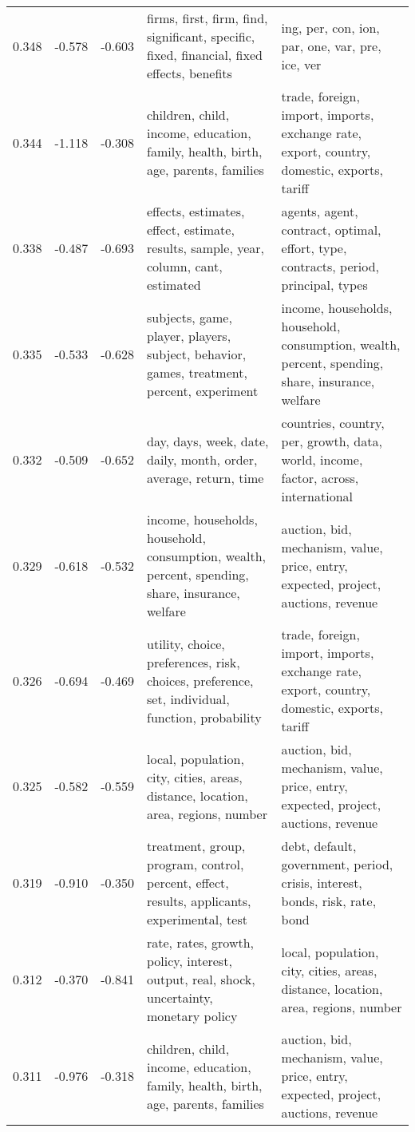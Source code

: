 \begin{tabular}{cccp{5cm}p{5cm}}
0.348 & -0.578 & -0.603 & firms, first, firm, find, significant, specific, fixed, financial, fixed effects, benefits & ing, per, con, ion, par, one, var, pre, ice, ver \\
0.344 & -1.118 & -0.308 & children, child, income, education, family, health, birth, age, parents, families & trade, foreign, import, imports, exchange rate, export, country, domestic, exports, tariff \\
0.338 & -0.487 & -0.693 & effects, estimates, effect, estimate, results, sample, year, column, cant, estimated & agents, agent, contract, optimal, effort, type, contracts, period, principal, types \\
0.335 & -0.533 & -0.628 & subjects, game, player, players, subject, behavior, games, treatment, percent, experiment & income, households, household, consumption, wealth, percent, spending, share, insurance, welfare \\
0.332 & -0.509 & -0.652 & day, days, week, date, daily, month, order, average, return, time & countries, country, per, growth, data, world, income, factor, across, international \\
0.329 & -0.618 & -0.532 & income, households, household, consumption, wealth, percent, spending, share, insurance, welfare & auction, bid, mechanism, value, price, entry, expected, project, auctions, revenue \\
0.326 & -0.694 & -0.469 & utility, choice, preferences, risk, choices, preference, set, individual, function, probability & trade, foreign, import, imports, exchange rate, export, country, domestic, exports, tariff \\
0.325 & -0.582 & -0.559 & local, population, city, cities, areas, distance, location, area, regions, number & auction, bid, mechanism, value, price, entry, expected, project, auctions, revenue \\
0.319 & -0.910 & -0.350 & treatment, group, program, control, percent, effect, results, applicants, experimental, test & debt, default, government, period, crisis, interest, bonds, risk, rate, bond \\
0.312 & -0.370 & -0.841 & rate, rates, growth, policy, interest, output, real, shock, uncertainty, monetary policy & local, population, city, cities, areas, distance, location, area, regions, number \\
0.311 & -0.976 & -0.318 & children, child, income, education, family, health, birth, age, parents, families & auction, bid, mechanism, value, price, entry, expected, project, auctions, revenue \\

\end{tabular}
